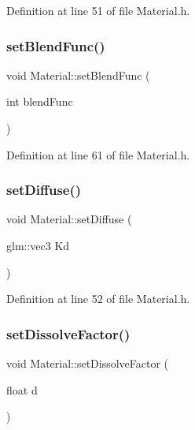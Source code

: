 Definition at line 51 of file Material.\+h.

\mbox{\label{class_material_a3e20f3c7602300c54b2e8b5ee1c73c42}} 
\subsubsection{\texorpdfstring{set\+Blend\+Func()}{setBlendFunc()}}
{\footnotesize\ttfamily void Material\+::set\+Blend\+Func (\begin{DoxyParamCaption}\item[{int}]{blend\+Func }\end{DoxyParamCaption})\hspace{0.3cm}{\ttfamily [inline]}}



Definition at line 61 of file Material.\+h.

\mbox{\label{class_material_a4cb374db09a8167ebf36ab17fd373fe3}} 
\subsubsection{\texorpdfstring{set\+Diffuse()}{setDiffuse()}}
{\footnotesize\ttfamily void Material\+::set\+Diffuse (\begin{DoxyParamCaption}\item[{glm\+::vec3}]{Kd }\end{DoxyParamCaption})\hspace{0.3cm}{\ttfamily [inline]}}



Definition at line 52 of file Material.\+h.

\mbox{\label{class_material_a5974bc8810af827031f0697d21418c3a}} 
\subsubsection{\texorpdfstring{set\+Dissolve\+Factor()}{setDissolveFactor()}}
{\footnotesize\ttfamily void Material\+::set\+Dissolve\+Factor (\begin{DoxyParamCaption}\item[{float}]{d }\end{DoxyParamCaption})\hspace{0.3cm}{\ttfamily [inline]}}



